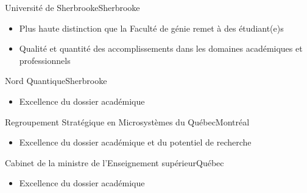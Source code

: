 {Université de Sherbrooke}{Sherbrooke}
{\vspace{-12pt}
\begin{itemize}
    \item Plus haute distinction que la Faculté de génie remet à des étudiant(e)s
    \item Qualité et quantité des accomplissements dans les domaines académiques et professionnels
\end{itemize}}

{Nord Quantique}{Sherbrooke}
{\vspace{-12pt}
\begin{itemize}
    \item Excellence du dossier académique
\end{itemize}}

{Regroupement Stratégique en Microsystèmes du Québec}{Montréal}
{\vspace{-12pt}
\begin{itemize}
    \item Excellence du dossier académique et du potentiel de recherche
\end{itemize}}

{Cabinet de la ministre de l'Enseignement supérieur}{Québec}
{\vspace{-12pt}
\begin{itemize}
    \item Excellence du dossier académique
\end{itemize}}
